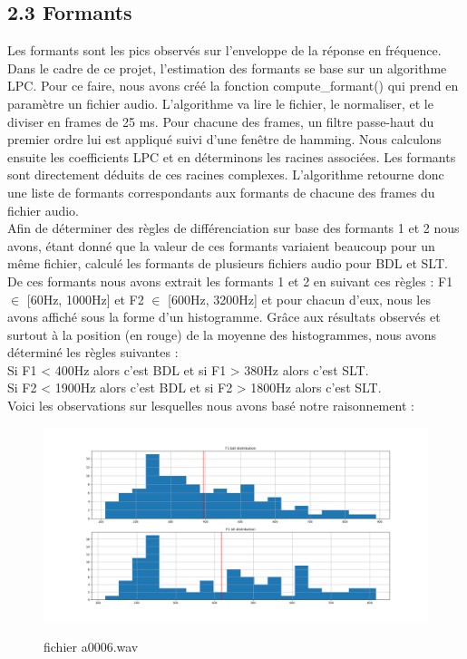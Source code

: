\documentclass[a4paper,12pt]{report}	%
\begin{document}
{\subsection*{2.3 Formants}}
Les formants sont les pics observés sur l'enveloppe de la réponse en fréquence. Dans le cadre de ce projet, l'estimation des formants se base sur un algorithme LPC. Pour ce faire, nous avons créé la fonction compute\_formant() qui prend en paramètre un fichier audio. L'algorithme va lire le fichier, le normaliser, et le diviser en frames de 25 ms. Pour chacune des frames, un filtre passe-haut du premier ordre lui est appliqué suivi d'une fenêtre de hamming. Nous calculons ensuite les coefficients LPC et en déterminons les racines associées. Les formants sont directement déduits de ces racines complexes. L'algorithme retourne donc une liste de formants correspondants aux formants de chacune des frames du fichier audio. \\
Afin de déterminer des règles de différenciation sur base des formants 1 et 2 nous avons, étant donné que la valeur de ces formants variaient beaucoup pour un même fichier, calculé les formants de plusieurs fichiers audio pour BDL et SLT. De ces formants nous avons extrait les formants 1 et 2 en suivant ces règles : F1 $\in$ [60Hz, 1000Hz] et F2 $\in$ [600Hz, 3200Hz] et pour chacun d'eux, nous les avons affiché sous la forme d'un histogramme. Grâce aux résultats observés et surtout à la position (en rouge) de la moyenne des histogrammes, nous avons déterminé les règles suivantes : \\
Si F1 < 400Hz alors c'est BDL et si F1 > 380Hz alors c'est SLT.\\
Si F2 < 1900Hz alors c'est BDL et si F2 > 1800Hz alors c'est SLT. \\
Voici les observations sur lesquelles nous avons basé notre raisonnement : \\
\begin{figure}[H]
	{\includegraphics[scale=0.35]{figures/F1_distr_a0006.png}}
	\caption{fichier a0006.wav} 
\end{figure}
\end{document}
